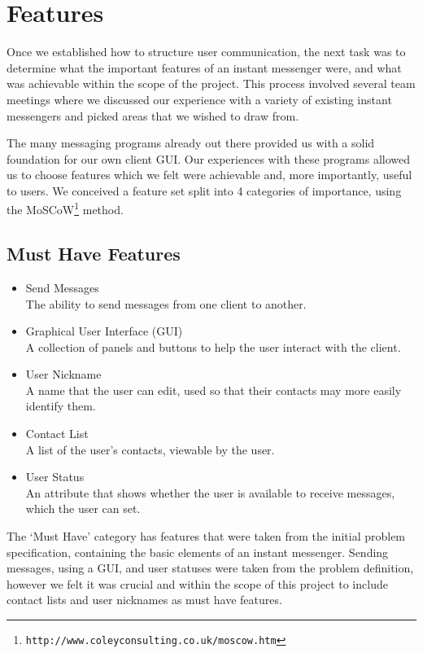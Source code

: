 \section{Features}
\label{features}

Once we established how to structure user communication, the next task was to determine what the important features of an instant messenger were, and what was achievable within the scope of the project. This process involved several team meetings where we discussed our experience with a variety of existing instant messengers and picked areas that we wished to draw from.

The many messaging programs already out there provided us with a solid foundation for our own client GUI. Our experiences with these programs allowed us to choose features which we felt were achievable and, more importantly, useful to users. We conceived a feature set split into 4 categories of importance, using the MoSCoW\footnote{\texttt{http://www.coleyconsulting.co.uk/moscow.htm}} method.

\subsection*{Must Have Features}

\begin{itemize}
\item{Send Messages\\
	The ability to send messages from one client to another.}
\item{Graphical User Interface (GUI)\\
	A collection of panels and buttons to help the user interact with the client.}
\item{User Nickname\\
	A name that the user can edit, used so that their contacts may more easily identify them.}
\item{Contact List\\
	A list of the user's contacts, viewable by the user.}
\item{User Status\\
	An attribute that shows whether the user is available to receive messages, which the user can set.}
\end{itemize}

The `Must Have' category has features that were taken from the initial problem specification, containing the basic elements of an instant messenger. Sending messages, using a GUI, and user statuses were taken from the problem definition, however we felt it was crucial and within the scope of this project to include contact lists and user nicknames as must have features.


